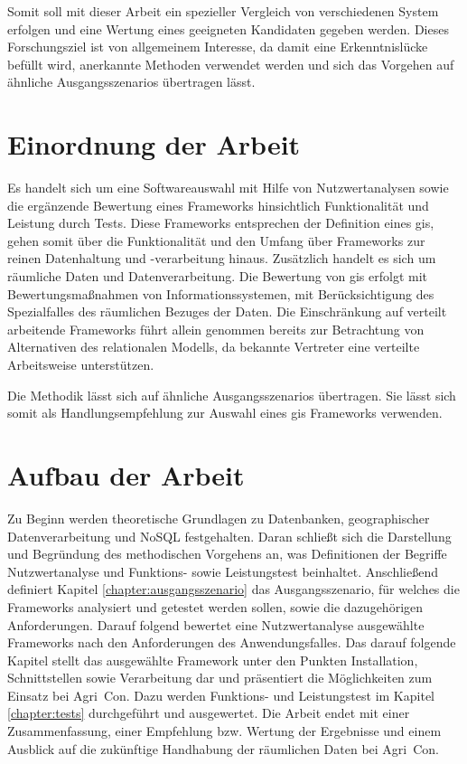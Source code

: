 Somit soll mit dieser Arbeit ein spezieller Vergleich von verschiedenen System erfolgen und eine Wertung eines geeigneten Kandidaten gegeben werden.
Dieses Forschungsziel ist von allgemeinem Interesse, da damit eine Erkenntnislücke befüllt wird, anerkannte Methoden verwendet werden und sich das Vorgehen auf ähnliche Ausgangsszenarios übertragen lässt.

\section{Einordnung der Arbeit}
Es handelt sich um eine Softwareauswahl mit Hilfe von Nutzwertanalysen sowie die ergänzende Bewertung eines Frameworks hinsichtlich Funktionalität und Leistung durch Tests.
Diese Frameworks entsprechen der Definition eines \Gls{gis}, gehen somit über die Funktionalität und den Umfang über Frameworks zur reinen Datenhaltung und -verarbeitung hinaus.
Zusätzlich handelt es sich um räumliche Daten und Datenverarbeitung.
Die Bewertung von \Gls{gis} erfolgt mit Bewertungsmaßnahmen von Informationssystemen, mit Berücksichtigung des Spezialfalles des räumlichen Bezuges der Daten.
Die Einschränkung auf verteilt arbeitende Frameworks führt allein genommen bereits zur Betrachtung von Alternativen des relationalen Modells, da bekannte Vertreter eine verteilte Arbeitsweise unterstützen.

Die Methodik lässt sich auf ähnliche Ausgangsszenarios übertragen.
Sie lässt sich somit als Handlungsempfehlung zur Auswahl eines \Gls{gis} Frameworks verwenden.

\section{Aufbau der Arbeit}
Zu Beginn werden theoretische Grundlagen zu Datenbanken, geographischer Datenverarbeitung und NoSQL festgehalten.
Daran schließt sich die Darstellung und Begründung des methodischen Vorgehens an, was Definitionen der Begriffe Nutzwertanalyse und Funktions- sowie Leistungstest beinhaltet.
Anschließend definiert Kapitel \ref{chapter:ausgangsszenario} das Ausgangsszenario, für welches die Frameworks analysiert und getestet werden sollen, sowie die dazugehörigen Anforderungen.
Darauf folgend bewertet eine Nutzwertanalyse ausgewählte Frameworks nach den Anforderungen des Anwendungsfalles.
Das darauf folgende Kapitel stellt das ausgewählte Framework unter den Punkten Installation, Schnittstellen sowie Verarbeitung dar und präsentiert die Möglichkeiten zum Einsatz bei Agri~Con.
Dazu werden Funktions- und Leistungstest im Kapitel \ref{chapter:tests} durchgeführt und ausgewertet.
Die Arbeit endet mit einer Zusammenfassung, einer Empfehlung bzw. Wertung der Ergebnisse und einem Ausblick auf die zukünftige Handhabung der räumlichen Daten bei Agri~Con.



